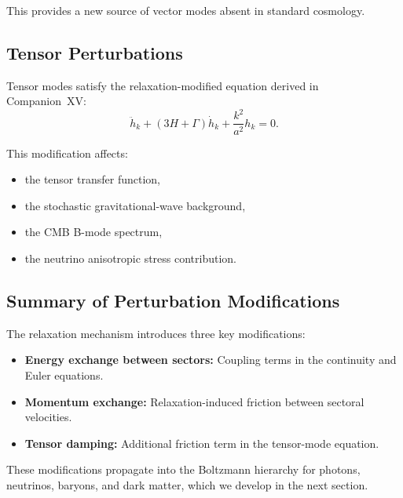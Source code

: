 \documentclass[11pt,a4paper]{article}
\begin{document}
This provides a new source of vector modes absent in standard cosmology.

\subsection{Tensor Perturbations}

Tensor modes satisfy the relaxation-modified equation derived in Companion~XV:
\begin{equation}
\ddot{h}_k + (3H + \Gamma)\dot{h}_k + \frac{k^2}{a^2}h_k = 0.
\end{equation}

This modification affects:

\begin{itemize}
\item the tensor transfer function,
\item the stochastic gravitational-wave background,
\item the CMB B-mode spectrum,
\item the neutrino anisotropic stress contribution.
\end{itemize}

\subsection{Summary of Perturbation Modifications}

The relaxation mechanism introduces three key modifications:

\begin{itemize}
\item \textbf{Energy exchange between sectors:} Coupling terms in the continuity and Euler equations.
\item \textbf{Momentum exchange:} Relaxation-induced friction between sectoral velocities.
\item \textbf{Tensor damping:} Additional friction term in the tensor-mode equation.
\end{itemize}

These modifications propagate into the Boltzmann hierarchy for photons, neutrinos, baryons, and dark matter, which we develop in the next section.
\end{document}
